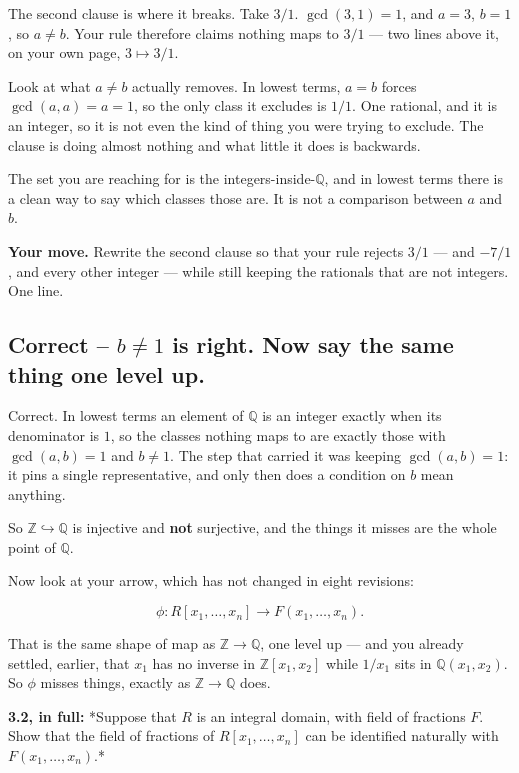 \documentclass[11pt]{article}
\begin{document}
The second clause is where it breaks. Take $3/1$. $\gcd(3,1) = 1$, and $a = 3$, $b = 1$, so $a \neq b$. Your rule therefore claims nothing maps to $3/1$ --- two lines above it, on your own page, $3 \mapsto 3/1$.

Look at what $a \neq b$ actually removes. In lowest terms, $a = b$ forces $\gcd(a,a) = a = 1$, so the only class it excludes is $1/1$. One rational, and it is an integer, so it is not even the kind of thing you were trying to exclude. The clause is doing almost nothing and what little it does is backwards.

The set you are reaching for is the integers-inside-$\mathbb{Q}$, and in lowest terms there is a clean way to say which classes those are. It is not a comparison between $a$ and $b$.

\textbf{Your move.} Rewrite the second clause so that your rule rejects $3/1$ --- and $-7/1$, and every other integer --- while still keeping the rationals that are not integers. One line.


\subsection*{Correct -- $b \neq 1$ is right. Now say the same thing one level up.}
Correct. In lowest terms an element of $\mathbb{Q}$ is an integer exactly when its denominator is $1$, so the classes nothing maps to are exactly those with $\gcd(a,b)=1$ and $b \neq 1$. The step that carried it was keeping $\gcd(a,b)=1$: it pins a single representative, and only then does a condition on $b$ mean anything.

So $\mathbb{Z} \hookrightarrow \mathbb{Q}$ is injective and \textbf{not} surjective, and the things it misses are the whole point of $\mathbb{Q}$.

Now look at your arrow, which has not changed in eight revisions:

$$\phi : R[x_1,\ldots,x_n] \longrightarrow F(x_1,\ldots,x_n).$$

That is the same shape of map as $\mathbb{Z} \to \mathbb{Q}$, one level up --- and you already settled, earlier, that $x_1$ has no inverse in $\mathbb{Z}[x_1,x_2]$ while $1/x_1$ sits in $\mathbb{Q}(x_1,x_2)$. So $\phi$ misses things, exactly as $\mathbb{Z} \to \mathbb{Q}$ does.

\textbf{3.2, in full:} *Suppose that $R$ is an integral domain, with field of fractions $F$. Show that the field of fractions of $R[x_1,\ldots,x_n]$ can be identified naturally with $F(x_1,\ldots,x_n)$.*
\end{document}
